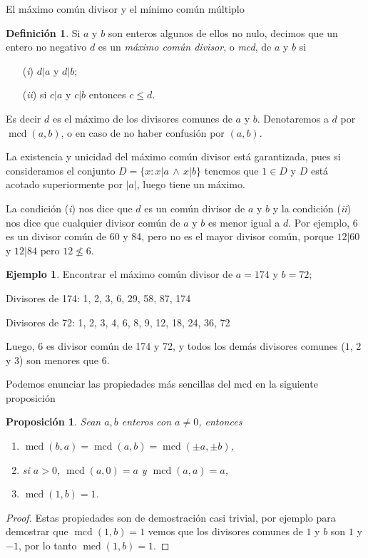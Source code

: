 \documentclass[11pt,spanish,makeidx]{amsbook}
\newtheorem{proposicion}[teorema]{Proposici\'on}
\theoremstyle{definition}
\newtheorem{definicion}{Definici\'on}[section]
\newtheorem{ejemplo}{Ejemplo}[section]
\theoremstyle{remark}
\newcommand \mcd{\operatorname{mcd}}
\begin{document}
\begin{section}{El máximo común divisor y el mínimo común múltiplo}\label{1.7}
	
\begin{definicion}\label{def-mcd} Si $a$ y $b$ son enteros algunos de ellos no nulo, decimos que un entero no negativo $d$ es un {\em máximo común divisor}, o {\em mcd}, de $a$ y $b$ si
\begin{enumerate}
\item[({\em i})] $d|a$ y $d|b$;
\item[({\em ii})] si $ c|a $ y $c|b$ entonces $ c \le d$.
\end{enumerate}
Es decir $d$ es el máximo de los divisores comunes de $a$ y $b$.  Denotaremos a $d$ por $\mcd(a,b)$, o en caso de no haber confusión por $(a,b)$.
\end{definicion}

La existencia y unicidad del máximo común divisor está garantizada, pues si consideramos el  conjunto $D = \{x: x |a \,\wedge\, x|b\}$ tenemos que $1 \in D$ y $D$ está acotado superiormente por $|a|$, luego tiene un máximo.  



La condición ({\em i}) nos dice que $d$ es un común divisor de $a$ y $b$ y la condición ({\em ii}) nos dice que cualquier divisor común de $a$ y $b$ es menor igual a $d$. Por ejemplo, 6 es un divisor común de 60 y 84, pero no es el mayor divisor común, porque $12|60$ y $12|84$ pero $12{\not \le }6$.

\begin{ejemplo} Encontrar el  máximo común divisor de $a = 174$ y $b =72$;

Divisores de 174: 1, 2, 3, 6, 29, 58, 87, 174

Divisores de 72: 1, 2, 3, 4, 6, 8, 9, 12, 18, 24, 36, 72 

Luego, $6$ es divisor común de 174 y 72, y todos los demás divisores comunes ($1$, $2$ y $3$) son menores que $6$.
\end{ejemplo}

Podemos enunciar las propiedades más sencillas del mcd en la siguiente proposición

\begin{proposicion} Sean $a,b$ enteros con $a \not = 0$, entonces
\begin{enumerate}
\item $\mcd(b,a) = \mcd(a,b) = \mcd(\pm a, \pm b)$,
\item si $a>0$,  $\mcd(a,0) = a$ y $\mcd(a,a) = a$,
\item $\mcd(1,b) = 1$.
\end{enumerate}
\end{proposicion}
\begin{proof}
Estas propiedades son de demostración casi trivial, por ejemplo para demostrar que  $\mcd(1,b) = 1$ vemos que los  divisores comunes de $1$ y $b$ son $1$ y $-1$, por lo tanto $\mcd(1,b) = 1$.


\end{proof}
\end{section}
\end{document}
